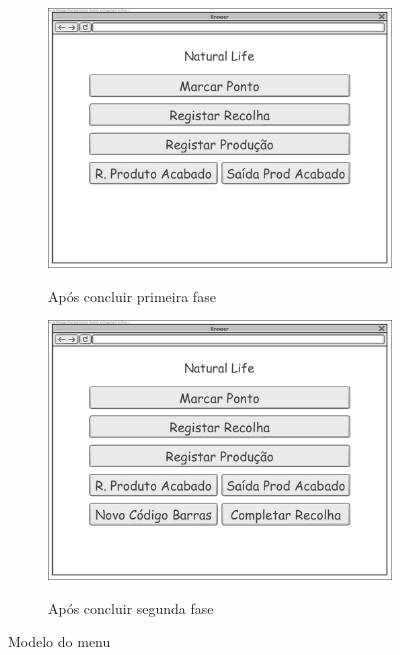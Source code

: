 \begin{figure}[H]
	\centering
	
	\begin{subfigure}[t]{0.45\linewidth}
		\includegraphics[width=\linewidth]{figuras/Diagramas_vp/DI_Fabrica_0_Menu_Inicial_1_Fase.jpg}
		\label{fig:di_fabrica_menu_1}
		\caption{Após concluir primeira fase}
	\end{subfigure}
	\begin{subfigure}[t]{0.45\linewidth}
		\includegraphics[width=\linewidth]{figuras/Diagramas_vp/DI_Fabrica_0_Menu_Inicial_2_Fase.jpg}
		\label{fig:di_fabrica_menu_2}
		\caption{Após concluir segunda fase}
	\end{subfigure}
	
	\caption{Modelo do menu}
	\label{fig:di_fabrica_menu}
\end{figure}